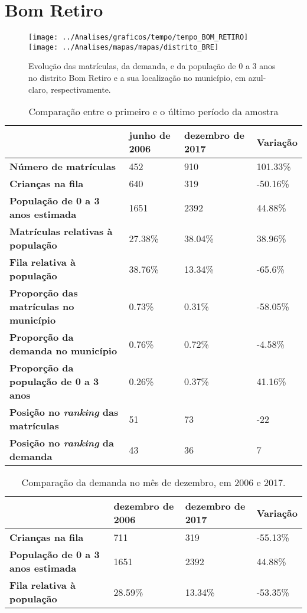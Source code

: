 \section{Bom Retiro}
\begin{figure}[H]
\centering
\texttt{[image: ../Analises/graficos/tempo/tempo\_BOM\_RETIRO]}
\texttt{[image: ../Analises/mapas/mapas/distrito\_BRE]}
\caption{Evolução das matrículas, da demanda, e da população de 0 a 3 anos no distrito Bom Retiro e a sua localização no município, em azul-claro, respectivamente.}
\end{figure}
\begin{table}[H]
\begin{tabular}{l|l|l|l}
\textbf{}                                      & \textbf{junho de 2006}       & \textbf{dezembro de 2017}    & \textbf{Variação} \\ \hline
\textbf{Número de matrículas}                  & 452 & 910 & 101.33\% \\ \hline
\textbf{Crianças na fila}                      & 640 & 319 & -50.16\% \\ \hline
\textbf{População de 0 a 3 anos estimada}      & 1651 & 2392 & 44.88\% \\ \hline
\textbf{Matrículas relativas à população}      & 27.38\% & 38.04\% & 38.96\% \\ \hline
\textbf{Fila relativa à população}             & 38.76\% & 13.34\% & -65.6\% \\ \hline
\textbf{Proporção das matrículas no município} & 0.73\% & 0.31\% & -58.05\% \\ \hline
\textbf{Proporção da demanda no município}     & 0.76\% & 0.72\% & -4.58\% \\ \hline
\textbf{Proporção da população de 0 a 3 anos}  & 0.26\% & 0.37\% & 41.16\% \\ \hline
\textbf{Posição no \textit{ranking} das matrículas}     & 51 & 73 & -22 \\ \hline
\textbf{Posição no \textit{ranking} da demanda}         & 43 & 36 & 7 \\ 
\end{tabular}
\caption{Comparação entre o primeiro e o último período da amostra}
\end{table}
\begin{table}[H]
\begin{tabular}{l|l|l|l}
\textbf{}                                 & \textbf{dezembro de 2006} & \textbf{dezembro de 2017} & \textbf{Variação} \\ \hline
\textbf{Crianças na fila}                      & 711 & 319 & -55.13\% \\ \hline
\textbf{População de 0 a 3 anos estimada}      & 1651 & 2392 & 44.88\% \\ \hline
\textbf{Fila relativa à população}             & 28.59\% & 13.34\% & -53.35\% \\
\end{tabular}
\caption{Comparação da demanda no mês de dezembro, em 2006 e 2017.}
\end{table}
